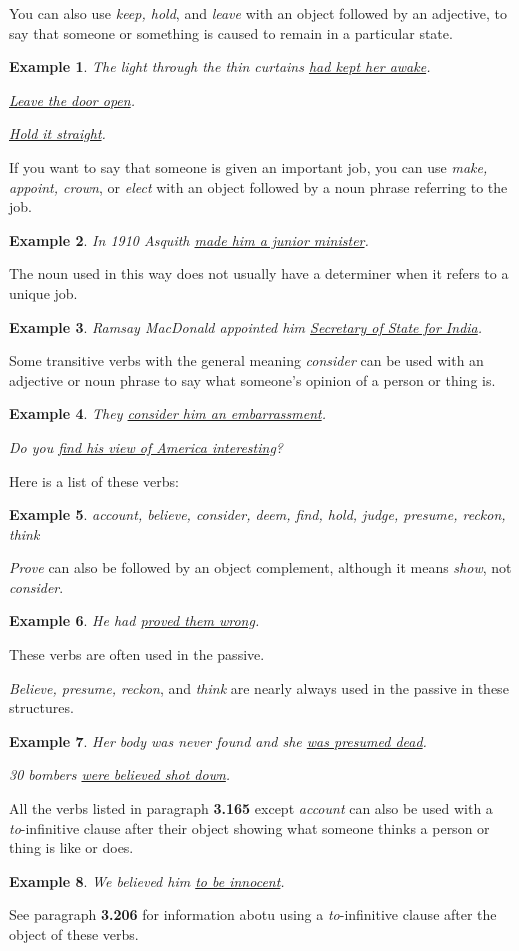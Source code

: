 \documentclass[oneside]{book}
\numberwithin{equation}{section}
\newtheorem{example}{Example}[section]
\begin{document}
%
\noindent{} You can also use \textit{keep, hold}, and \textit{leave} with an object followed by an adjective, to say that someone or something is caused to remain in a particular state.
\begin{example}
    The light through the thin curtains \underline{had kept her awake}.
    
    \underline{Leave the door open}.
    
    \underline{Hold it straight}.
\end{example}
%
\noindent{} If you want to say that someone is given an important job, you can use \textit{make, appoint, crown}, or \textit{elect} with an object followed by a noun phrase referring to the job.
\begin{example}
    In 1910 Asquith \underline{made him a junior minister}.
\end{example}
The noun used in this way does not usually have a determiner when it refers to a unique job.
\begin{example}
    Ramsay MacDonald appointed him \underline{Secretary of State for India}.
\end{example}
%
\noindent{} Some transitive verbs with the general meaning \textit{consider} can be used with an adjective or noun phrase to say what someone's opinion of a person or thing is.
\begin{example}
    They \underline{consider him an embarrassment}.
    
    Do you \underline{find his view of America interesting}?
\end{example}
Here is a list of these verbs:
\begin{example}
    account, believe, consider, deem, find, hold, judge, presume, reckon, think
\end{example}
\textit{Prove} can also be followed by an object complement, although it means \textit{show}, not \textit{consider}.
\begin{example}
    He had \underline{proved them wrong}.
\end{example}
%
\noindent{} These verbs are often used in the passive.

\textit{Believe, presume, reckon}, and \textit{think} are nearly always used in the passive in these structures.
\begin{example}
    Her body was never found and she \underline{was presumed dead}.
    
    30 bombers \underline{were believed shot down}.
\end{example}
%
\noindent{} All the verbs listed in paragraph \textbf{3.165} except \textit{account} can also be used with a \textit{to}-infinitive  clause after their object showing what someone thinks a person or thing is like or does.
\begin{example}
    We believed him \underline{to be innocent}.
\end{example}
See paragraph \textbf{3.206} for information abotu using a \textit{to}-infinitive clause after the object of these verbs.
\end{document}
